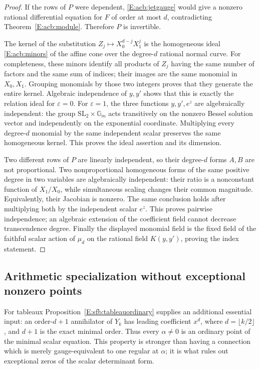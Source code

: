 \documentclass[11pt,a4paper]{article}
\theoremstyle{definition}
\theoremstyle{remark}
\numberwithin{equation}{section}
\begin{document}
\begin{proof}
If the rows of $P$ were dependent, \eqref{E:acb:jetgauge} would give
a nonzero rational differential equation for $F$ of order at most
$d$, contradicting Theorem~\ref{E:acb:module}.  Therefore $P$ is
invertible.

The kernel of the substitution
$Z_j\mapsto X_0^{d-j}X_1^j$ is the homogeneous ideal
\eqref{E:acb:minors} of the affine cone over the degree-$d$ rational
normal curve.  For completeness, these minors identify all
products of $Z_j$ having the same number of factors and the same
sum of indices; their images are the same monomial in $X_0,X_1$.
Grouping monomials by those two integers proves that they generate
the entire kernel.  Algebraic independence of $y,y'$ shows that
this is exactly the relation ideal for $\varepsilon=0$.
For $\varepsilon=1$, the three functions $y,y',e^z$ are
algebraically independent: the group
$\mathrm{SL}_2\times\mathbb G_m$ acts transitively on the
nonzero Bessel solution vector and independently on the
exponential coordinate.  Multiplying every degree-$d$ monomial
by the same independent scalar preserves the same homogeneous
kernel.  This proves the ideal assertion and its dimension.

Two different rows of $P$ are linearly independent, so their
degree-$d$ forms $A,B$ are not proportional.  Two nonproportional
homogeneous forms of the same positive degree in two variables
are algebraically independent: their ratio is a nonconstant
function of $X_1/X_0$, while simultaneous scaling changes their
common magnitude.  Equivalently, their Jacobian is nonzero.
The same conclusion holds after multiplying both by the
independent scalar $e^z$.  This proves pairwise independence;
an algebraic extension of the coefficient field cannot decrease
transcendence degree.  Finally the displayed monomial field is
the fixed field of the faithful scalar action of $\mu_d$ on
the rational field $K(y,y')$, proving the index statement.
\end{proof}

\subsection{Arithmetic specialization without exceptional nonzero points}

For tableaux Proposition~\ref{E:sfb:tableauordinary} supplies an
additional essential input: an order-$d+1$ annihilator of $Y_k$
has leading coefficient $x^d$, where $d=\lfloor k/2\rfloor$,
and $d+1$ is the exact minimal order.  Thus every
$\alpha\ne0$ is an ordinary point of the minimal scalar equation.
This property is stronger than having a connection which is
merely gauge-equivalent to one regular at $\alpha$; it is what
rules out exceptional zeros of the scalar determinant form.
\end{document}
